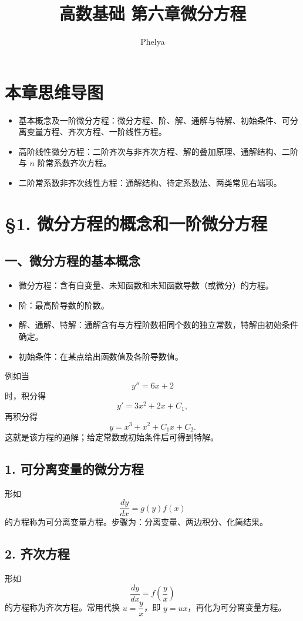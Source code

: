 \documentclass[12pt]{article}
\title{高数基础 第六章\quad 微分方程}
\author{Phelya}
\date{}
\begin{document}
\maketitle

\section*{本章思维导图}
\begin{itemize}
\item 基本概念及一阶微分方程：微分方程、阶、解、通解与特解、初始条件、可分离变量方程、齐次方程、一阶线性方程。
\item 高阶线性微分方程：二阶齐次与非齐次方程、解的叠加原理、通解结构、二阶与 $n$ 阶常系数齐次方程。
\item 二阶常系数非齐次线性方程：通解结构、待定系数法、两类常见右端项。
\end{itemize}

\section*{\S 1. 微分方程的概念和一阶微分方程}
\subsection*{一、微分方程的基本概念}
\begin{itemize}
\item 微分方程：含有自变量、未知函数和未知函数导数（或微分）的方程。
\item 阶：最高阶导数的阶数。
\item 解、通解、特解：通解含有与方程阶数相同个数的独立常数，特解由初始条件确定。
\item 初始条件：在某点给出函数值及各阶导数值。
\end{itemize}

例如当
\[
y''=6x+2
\]
时，积分得
\[
y'=3x^2+2x+C_1,
\]
再积分得
\[
y=x^3+x^2+C_1x+C_2.
\]
这就是该方程的通解；给定常数或初始条件后可得到特解。

\subsection*{1. 可分离变量的微分方程}
形如
\[
\frac{dy}{dx}=g(y)f(x)
\]
的方程称为可分离变量方程。步骤为：分离变量、两边积分、化简结果。

\subsection*{2. 齐次方程}
形如
\[
\frac{dy}{dx}=f\!\left(\frac{y}{x}\right)
\]
的方程称为齐次方程。常用代换 $u=\dfrac{y}{x}$，即 $y=ux$，再化为可分离变量方程。
\end{document}

